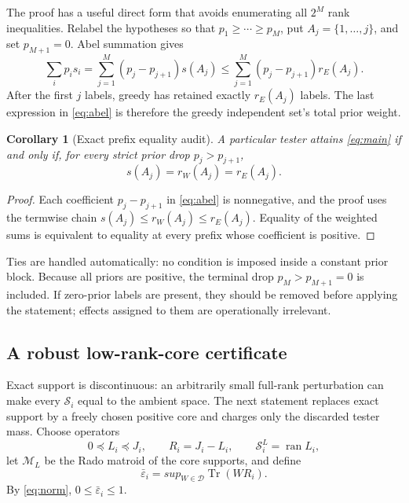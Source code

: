 \documentclass[11pt]{article}
\newtheorem{corollary}[theorem]{Corollary}
\theoremstyle{definition}
\theoremstyle{remark}
\newcommand{\ran}{\operatorname{ran}}
\newcommand{\Tr}{\operatorname{Tr}}
\newcommand{\cD}{\mathcal D}
\newcommand{\cM}{\mathcal M}
\newcommand{\cS}{\mathcal S}
\begin{document}
The proof has a useful direct form that avoids enumerating all $2^M$ rank
inequalities.  Relabel the hypotheses so that
$p_1\geq\cdots\geq p_M$, put $A_j=\{1,\ldots,j\}$, and set
$p_{M+1}=0$.  Abel summation gives
\begin{equation}
 \sum_i p_is_i
 =\sum_{j=1}^M(p_j-p_{j+1})s(A_j)
 \leq\sum_{j=1}^M(p_j-p_{j+1})r_E(A_j).                 \label{eq:abel}
\end{equation}
After the first $j$ labels, greedy has retained exactly $r_E(A_j)$ labels.
The last expression in \cref{eq:abel} is therefore the greedy independent
set's total prior weight.

\begin{corollary}[Exact prefix equality audit]\label{cor:prefix}
A particular tester attains \cref{eq:main} if and only if, for every strict
prior drop $p_j>p_{j+1}$,
\begin{equation}
                s(A_j)=r_W(A_j)=r_E(A_j).               \label{eq:prefix}
\end{equation}
\end{corollary}

\begin{proof}
Each coefficient $p_j-p_{j+1}$ in \cref{eq:abel} is nonnegative, and the
proof uses the termwise chain
$s(A_j)\leq r_W(A_j)\leq r_E(A_j)$.  Equality of the weighted sums is
equivalent to equality at every prefix whose coefficient is positive.
\end{proof}

Ties are handled automatically: no condition is imposed inside a constant
prior block.  Because all priors are positive, the terminal drop
$p_M>p_{M+1}=0$ is included.  If zero-prior labels are present, they should be
removed before applying the statement; effects assigned to them are
operationally irrelevant.

\subsection{A robust low-rank-core certificate}

Exact support is discontinuous: an arbitrarily small full-rank perturbation
can make every $\cS_i$ equal to the ambient space.  The next statement replaces
exact support by a freely chosen positive core and charges only the discarded
tester mass.  Choose operators
\begin{equation}
 0\preceq L_i\preceq J_i,\qquad R_i=J_i-L_i,\qquad
 \cS_i^{L}=\ran L_i,                                    \label{eq:cores}
\end{equation}
let $\cM_L$ be the Rado matroid of the core supports, and define
\begin{equation}
 \bar\varepsilon_i=sup_{W\in\cD}\Tr(WR_i).
                                                               \label{eq:tailmass}
\end{equation}
By \cref{eq:norm}, $0\leq\bar\varepsilon_i\leq1$.
\end{document}
